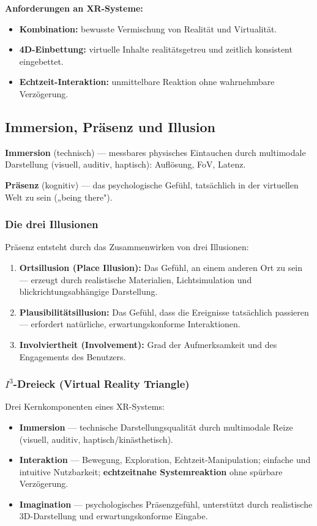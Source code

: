 \documentclass[12pt, a4paper]{article}
\begin{document}
\textbf{Anforderungen an XR-Systeme:}
\begin{itemize}
  \item \textbf{Kombination:} bewusste Vermischung von Realität und Virtualität.
  \item \textbf{4D-Einbettung:} virtuelle Inhalte realitätsgetreu und zeitlich konsistent eingebettet.
  \item \textbf{Echtzeit-Interaktion:} unmittelbare Reaktion ohne wahrnehmbare Verzögerung.
\end{itemize}

\subsection{Immersion, Präsenz und Illusion}

\textbf{Immersion} (technisch) — messbares physisches Eintauchen durch multimodale Darstellung (visuell, auditiv, haptisch): Auflösung, FoV, Latenz.

\textbf{Präsenz} (kognitiv) — das psychologische Gefühl, tatsächlich in der virtuellen Welt zu sein („being there").

\subsubsection*{Die drei Illusionen}

Präsenz entsteht durch das Zusammenwirken von drei Illusionen:
\begin{enumerate}
  \item \textbf{Ortsillusion (Place Illusion):} Das Gefühl, an einem anderen Ort zu sein — erzeugt durch realistische Materialien, Lichtsimulation und blickrichtungsabhängige Darstellung.
  \item \textbf{Plausibilitätsillusion:} Das Gefühl, dass die Ereignisse tatsächlich passieren — erfordert natürliche, erwartungskonforme Interaktionen.
  \item \textbf{Involviertheit (Involvement):} Grad der Aufmerksamkeit und des Engagements des Benutzers.
\end{enumerate}

\subsubsection*{$I^3$-Dreieck (Virtual Reality Triangle)}

Drei Kernkomponenten eines XR-Systems:
\begin{itemize}
  \item \textbf{Immersion} — technische Darstellungsqualität durch multimodale Reize (visuell, auditiv, haptisch/kinästhetisch).
  \item \textbf{Interaktion} — Bewegung, Exploration, Echtzeit-Manipulation; einfache und intuitive Nutzbarkeit; \textbf{echtzeitnahe Systemreaktion} ohne spürbare Verzögerung.
  \item \textbf{Imagination} — psychologisches Präsenzgefühl, unterstützt durch realistische 3D-Darstellung und erwartungskonforme Eingabe.
\end{itemize}
\end{document}
